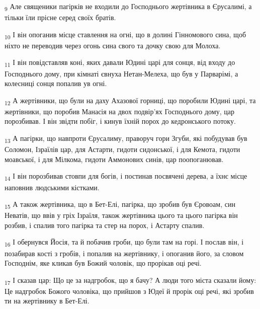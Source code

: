 \begin{tcolorbox}
\textsubscript{9} Але священики пагірків не входили до Господнього жертівника в Єрусалимі, а тільки їли прісне серед своїх братів.
\end{tcolorbox}
\begin{tcolorbox}
\textsubscript{10} І він опоганив місце ставлення на огні, що в долині Гінномового сина, щоб ніхто не переводив через огонь сина свого та дочку свою для Молоха.
\end{tcolorbox}
\begin{tcolorbox}
\textsubscript{11} І він повідставляв коні, яких давали Юдині царі для сонця, від входу до Господнього дому, при кімнаті євнуха Нетан-Мелеха, що був у Парварімі, а колесниці сонця попалив ув огні.
\end{tcolorbox}
\begin{tcolorbox}
\textsubscript{12} А жертівники, що були на даху Ахазової горниці, що поробили Юдині царі, та жертівники, що поробив Манасія на двох подвір'ях Господнього дому, цар порозбивав. І він звідти побіг, і кинув їхній порох до кедронського потоку.
\end{tcolorbox}
\begin{tcolorbox}
\textsubscript{13} А пагірки, що навпроти Єрусалиму, праворуч гори Згуби, які побудував був Соломон, Ізраїлів цар, для Астарти, гидоти сидонської, і для Кемота, гидоти моавської, і для Мілкома, гидоти Аммонових синів, цар поопоганював.
\end{tcolorbox}
\begin{tcolorbox}
\textsubscript{14} І він порозбивав стовпи для богів, і постинав посвячені дерева, а їхнє місце наповнив людськими кістками.
\end{tcolorbox}
\begin{tcolorbox}
\textsubscript{15} А також жертівника, що в Бет-Елі, пагірка, що зробив був Єровоам, син Неватів, що ввів у гріх Ізраїля, також жертівника цього та цього пагірка він розбив, і спалив того пагірка та стер на порох, і Астарту спалив.
\end{tcolorbox}
\begin{tcolorbox}
\textsubscript{16} І обернувся Йосія, та й побачив гроби, що були там на горі. І послав він, і позабирав кості з гробів, і попалив на жертівнику, і опоганив його, за словом Господнім, яке кликав був Божий чоловік, що прорікав оці речі.
\end{tcolorbox}
\begin{tcolorbox}
\textsubscript{17} І сказав цар: Що це за надгробок, що я бачу? А люди того міста сказали йому: Це надгробок Божого чоловіка, що прийшов з Юдеї й прорік оці речі, які зробив ти на жертівнику в Бет-Елі.
\end{tcolorbox}
